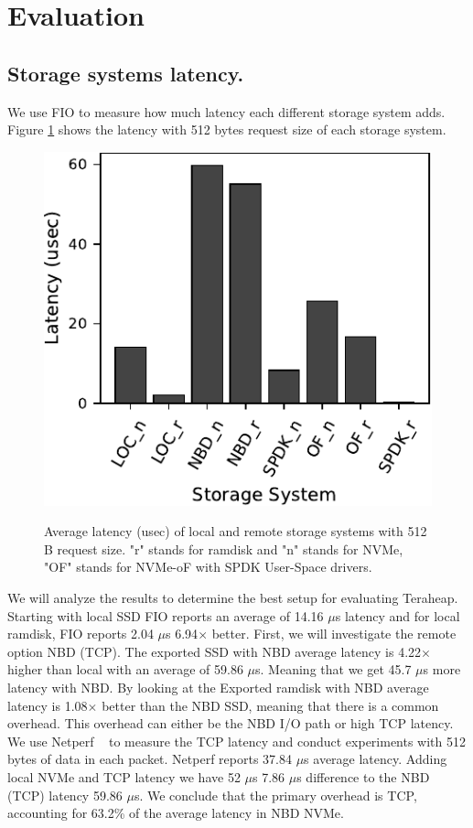 \section{Evaluation}
\subsection{Storage systems latency.}
We use FIO to measure how much latency each different storage system adds.
Figure \ref{fig:fio_512} shows the latency with 512 bytes request size
of each storage system.

\begin{figure}[H]
  \includegraphics[width=\linewidth]{figures/fio_512.pdf}\\
\caption{Average latency (usec) of local and remote storage systems with 512 B request size. "r" stands for ramdisk and "n" stands for NVMe, "OF" stands for NVMe-oF with SPDK User-Space drivers.}
\label{fig:fio_512}
\end{figure}

We will analyze the results to determine the best setup for evaluating Teraheap. Starting with local SSD FIO reports an average of 14.16 $\mu$s latency and for local ramdisk, FIO reports 2.04 $\mu$s 6.94$\times$ better. First, we will investigate the remote option NBD (TCP). The exported SSD with NBD average latency is 4.22$\times$ higher than local with an average of 59.86 $\mu$s. Meaning that we get 45.7 $\mu$s more latency with NBD. By looking at the Exported ramdisk with NBD average latency is 1.08$\times$ better than the NBD SSD, meaning that there is a common overhead. This overhead can either be the NBD I/O path or high TCP latency. We use Netperf ~\cite{netperf} to measure the TCP latency and conduct experiments with 512 bytes of data in each packet. Netperf reports 37.84 $\mu$s average
latency. Adding local NVMe and TCP latency we have 52 $\mu$s 7.86 $\mu$s difference to the NBD
(TCP) latency 59.86 $\mu$s. We conclude that the primary overhead is TCP, accounting for 63.2\% of the average latency in NBD NVMe.


